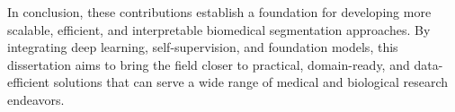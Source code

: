 \documentclass[./dissertation.tex]{subfiles}
\begin{document}
In conclusion, these contributions establish a foundation for developing more scalable, efficient, and interpretable biomedical segmentation approaches. By integrating deep learning, self-supervision, and foundation models, this dissertation aims to bring the field closer to practical, domain-ready, and data-efficient solutions that can serve a wide range of medical and biological research endeavors.









\end{document}
